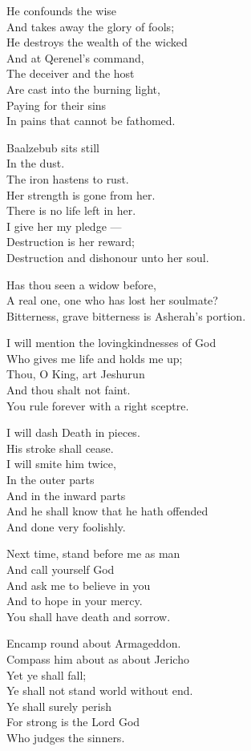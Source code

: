 \documentclass[
]{book}
\begin{document}
He confounds the wise\\
And takes away the glory of fools;\\
He destroys the wealth of the wicked\\
And at Qerenel's command,\\
The deceiver and the host\\
Are cast into the burning light,\\
Paying for their sins\\
In pains that cannot be fathomed.

Baalzebub sits still\\
In the dust.\\
The iron hastens to rust.\\
Her strength is gone from her.\\
There is no life left in her.\\
I give her my pledge ---\\
Destruction is her reward;\\
Destruction and dishonour unto her soul.

Has thou seen a widow before,\\
A real one, one who has lost her soulmate?\\
Bitterness, grave bitterness is Asherah's portion.

I will mention the lovingkindnesses of God\\
Who gives me life and holds me up;\\
Thou, O King, art Jeshurun\\
And thou shalt not faint.\\
You rule forever with a right sceptre.

I will dash Death in pieces.\\
His stroke shall cease.\\
I will smite him twice,\\
In the outer parts\\
And in the inward parts\\
And he shall know that he hath offended\\
And done very foolishly.

Next time, stand before me as man\\
And call yourself God\\
And ask me to believe in you\\
And to hope in your mercy.\\
You shall have death and sorrow.

Encamp round about Armageddon.\\
Compass him about as about Jericho\\
Yet ye shall fall;\\
Ye shall not stand world without end.\\
Ye shall surely perish\\
For strong is the Lord God\\
Who judges the sinners.
\end{document}
